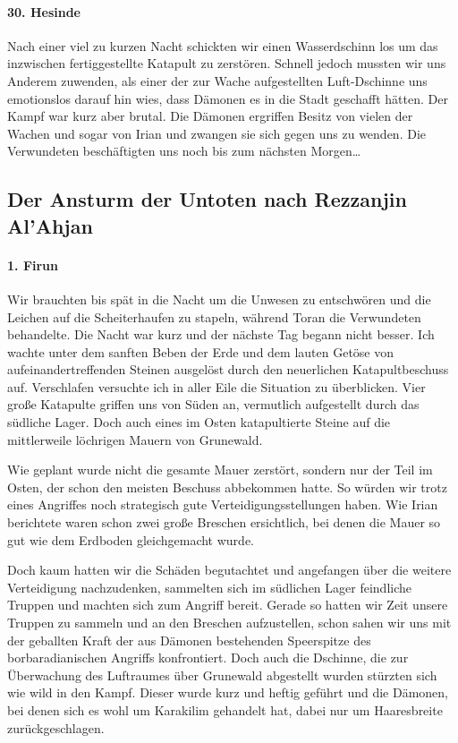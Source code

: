\paragraph{30. Hesinde}
Nach einer viel zu kurzen Nacht schickten wir einen Wasserdschinn los um das inzwischen fertiggestellte Katapult zu zerstören. Schnell jedoch mussten wir uns Anderem zuwenden, als einer der zur Wache aufgestellten Luft-Dschinne uns emotionslos darauf hin wies, dass Dämonen es in die Stadt geschafft hätten. Der Kampf war kurz aber brutal. Die Dämonen ergriffen Besitz von vielen der Wachen und sogar von Irian und zwangen sie sich gegen uns zu wenden. Die Verwundeten beschäftigten uns noch bis zum nächsten Morgen\dots

\subsection{Der Ansturm der Untoten nach Rezzanjin Al'Ahjan}

\paragraph{1. Firun}
Wir brauchten bis spät in die Nacht um die Unwesen zu entschwören und die Leichen auf die Scheiterhaufen zu stapeln, während Toran die Verwundeten behandelte. Die Nacht war kurz und der nächste Tag begann nicht besser. Ich wachte unter dem sanften Beben der Erde und dem lauten Getöse von aufeinandertreffenden Steinen ausgelöst durch den neuerlichen Katapultbeschuss auf. Verschlafen versuchte ich in aller Eile die Situation zu überblicken. Vier große Katapulte griffen uns von Süden an, vermutlich aufgestellt durch das südliche Lager. Doch auch eines im Osten katapultierte Steine auf die mittlerweile löchrigen Mauern von Grunewald. 

Wie geplant wurde nicht die gesamte Mauer zerstört, sondern nur der Teil im Osten, der schon den meisten Beschuss abbekommen hatte. So würden wir trotz eines Angriffes noch strategisch gute Verteidigungsstellungen haben. Wie Irian berichtete waren schon zwei große Breschen ersichtlich, bei denen die Mauer so gut wie dem Erdboden gleichgemacht wurde.

Doch kaum hatten wir die Schäden begutachtet und angefangen über die weitere Verteidigung nachzudenken, sammelten sich im südlichen Lager feindliche Truppen und machten sich zum Angriff bereit. Gerade so hatten wir Zeit unsere Truppen zu sammeln und an den Breschen aufzustellen, schon sahen wir uns mit der geballten Kraft der aus Dämonen bestehenden Speerspitze des borbaradianischen Angriffs konfrontiert. Doch auch die Dschinne, die zur Überwachung des Luftraumes über Grunewald abgestellt wurden stürzten sich wie wild in den Kampf. Dieser wurde kurz und heftig geführt und die Dämonen, bei denen sich es wohl um Karakilim gehandelt hat, dabei nur um Haaresbreite zurückgeschlagen. 

